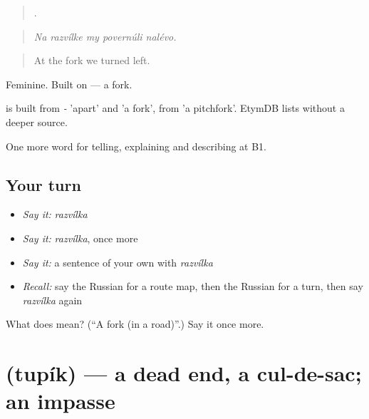 \begin{quote}
    .
\end{quote}

\begin{quote}
\emph{Na razvílke my povernúli nalévo.}
\end{quote}

\begin{quote}
At the fork we turned left.
\end{quote}

Feminine. Built on \emph{} — a fork.

\begin{cousinweb}
\emph{} is built from \emph{-} 'apart' and \emph{} 'a fork', from \emph{} 'a pitchfork'. EtymDB lists \emph{} without a deeper source.
\end{cousinweb}

\begin{grammarlens}[title={What you've built}]
One more word for telling, explaining and describing at B1.
\end{grammarlens}

\subsection*{Your turn}
\begin{itemize}
\raggedright
  \item \emph{Say it:} \emph{razvílka}
  \item \emph{Say it:} \emph{razvílka}, once more
  \item \emph{Say it:} a sentence of your own with \emph{razvílka}
  \item \emph{Recall:} say the Russian for a route map, then the Russian for a turn, then say \emph{razvílka} again
\end{itemize}

\begin{tcolorbox}[breakable,colback=teal!4,colframe=teal!35!black,title={Before you move on}]
What does  mean? (\textquotedblleft{}A fork (in a road)\textquotedblright{}.) Say it once more.
\end{tcolorbox}
\section[\texorpdfstring{\ru{тупик} (tupík)}{тупик (tupík)}]{ (tupík) — a dead end, a cul-de-sac; an impasse}


